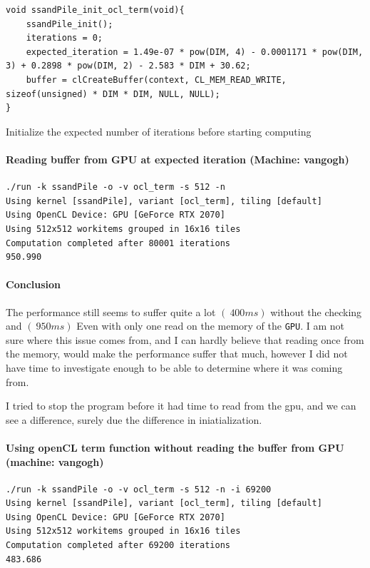 \documentclass{report}
\def\GPU{\texttt{GPU}}
\begin{document}
\begin{listing}[H]
	\begin{verbatim}
void ssandPile_init_ocl_term(void){
    ssandPile_init();
    iterations = 0;
    expected_iteration = 1.49e-07 * pow(DIM, 4) - 0.0001171 * pow(DIM, 3) + 0.2898 * pow(DIM, 2) - 2.583 * DIM + 30.62;
    buffer = clCreateBuffer(context, CL_MEM_READ_WRITE, sizeof(unsigned) * DIM * DIM, NULL, NULL);
}
\end{verbatim}
	\caption{Initialize the expected number of iterations before starting computing}
\end{listing}


\paragraph{Reading buffer from GPU at expected iteration (Machine: vangogh)}
\begin{verbatim}
./run -k ssandPile -o -v ocl_term -s 512 -n
Using kernel [ssandPile], variant [ocl_term], tiling [default]
Using OpenCL Device: GPU [GeForce RTX 2070]
Using 512x512 workitems grouped in 16x16 tiles 
Computation completed after 80001 iterations
950.990 
\end{verbatim}

\paragraph{Conclusion}
The performance still seems to suffer quite a lot $(~400 ms)$ without the checking and $(~950 ms)$
Even with only one read on the memory of the \GPU{}.
I am not sure where this issue comes from, and I can hardly believe that reading once from the memory,
would make the performance suffer that much, however I did not have time to investigate enough
to be able to determine where it was coming from.

I tried to stop the program before it had time to read from the gpu, and we can see a difference,
surely due the difference in iniatialization.


\paragraph{Using openCL term function without reading the buffer from GPU (machine: vangogh)}
\begin{verbatim}
./run -k ssandPile -o -v ocl_term -s 512 -n -i 69200
Using kernel [ssandPile], variant [ocl_term], tiling [default]
Using OpenCL Device: GPU [GeForce RTX 2070]
Using 512x512 workitems grouped in 16x16 tiles 
Computation completed after 69200 iterations
483.686 
\end{verbatim}
\end{document}
